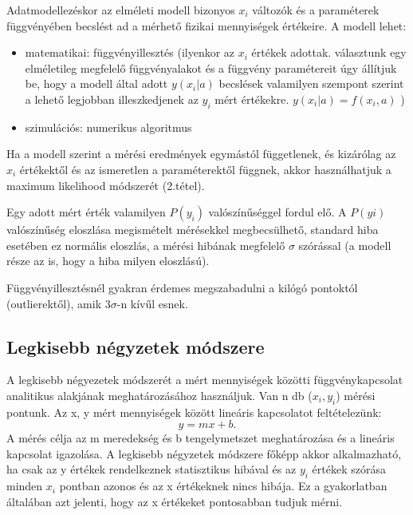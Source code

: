 \documentclass[12pt]{article}
\theoremstyle{plain}
\begin{document}
Adatmodellezéskor az elméleti modell bizonyos $x_i$ változók és a paraméterek függvényében becslést ad a mérhető fizikai mennyiségek értékeire. A modell lehet:
\begin{itemize}
    \item matematikai: függvényillesztés (ilyenkor az $x_i$ értékek adottak. választunk egy elméletileg megfelelő függvényalakot és a függvény paramétereit úgy állítjuk be, hogy a modell által adott $y(x_i
|a)$ becslések valamilyen szempont szerint a lehető legjobban illeszkedjenek az $y_i$ mért értékekre. $y(x_i
|a) = f(x_i, a)$ )
    \item szimulációs: numerikus algoritmus
\end{itemize}
Ha a modell szerint a mérési eredmények egymástól függetlenek, és kizárólag az $x_i$ értékektől és az ismeretlen a paraméterektől függnek, akkor használhatjuk a maximum likelihood módszerét (2.tétel). 


Egy adott mért érték valamilyen $P(y_i)$ valószínűséggel fordul elő. A $P(yi)$ valószínűség eloszlása megismételt mérésekkel megbecsülhető, standard hiba esetében ez normális eloszlás, a mérési hibának
megfelelő $\sigma$ szórással (a modell része az is, hogy a hiba milyen eloszlású). 

Függvényillesztésnél gyakran érdemes megszabadulni a kilógó pontoktól (outlierektől), amik $3 \sigma$-n kívűl esnek. 

\subsection*{Legkisebb négyzetek módszere}
A legkisebb négyezetek módszerét a mért mennyiségek közötti függvénykapcsolat analitikus alakjának meghatározásához használjuk. Van n db ($x_i, y_i$) mérési pontunk. Az x, y mért mennyiségek között lineáris kapcsolatot feltételezünk:
$$ y = mx+b. $$ A mérés célja az m meredekség és b tengelymetszet meghatározása és a lineáris kapcsolat igazolása. A legkisebb négyzetek módszere főképp akkor alkalmazható, ha csak az y értékek rendelkeznek statisztikus hibával és az $y_i$ értékek szórása minden $x_i$ pontban azonos és az x értékeknek nincs hibája. Ez a gyakorlatban általában azt jelenti, hogy az x értékeket pontosabban tudjuk mérni. 
\end{document}
